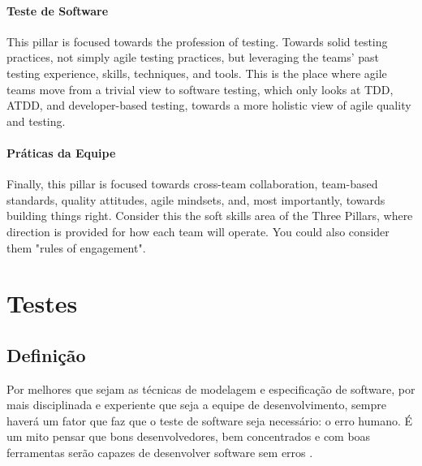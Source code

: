 \documentclass[
	12pt,				%
	openright,			%
	oneside,			%
	a4paper,			%
	english,			%
	brazil,				%
	]{abntex2}
\begin{document}
\subsubsection{Teste de Software}
This pillar is focused towards the profession of testing. Towards solid testing practices, not simply agile testing practices, but leveraging the teams' past testing experience, skills, techniques, and tools. This is the place where agile teams move from a trivial view to software testing, which only looks at TDD, ATDD, and developer-based testing, towards a more holistic view of agile quality and testing.

\subsubsection{Práticas da Equipe}
Finally, this pillar is focused towards cross-team collaboration, team-based standards, quality attitudes, agile mindsets, and, most importantly, towards building things right. Consider this the soft skills area of the Three Pillars, where direction is provided for how each team will operate. You could also consider them "rules of engagement".


\chapter{Testes}

\section{Definição}

\begin{citacao}
Por melhores que sejam as técnicas de modelagem e especificação de software, por mais disciplinada e experiente que seja a equipe de desenvolvimento, sempre haverá um fator que faz que o teste de software seja necessário: o erro humano. É um mito pensar que bons desenvolvedores, bem concentrados e com boas ferramentas serão capazes de desenvolver software sem erros . %
\end{citacao}
\end{document}
